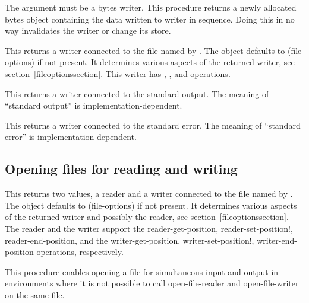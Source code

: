 \begin{entry}{%
}
   
The  argument must be a bytes writer.  This procedure
returns a newly allocated bytes object containing the data written to
writer in sequence. Doing this in no way invalidates the writer or
change its store.
\end{entry}

\begin{entry}{%
}
   
This returns a writer connected to the file named by .
The  object defaults to {\cf (file-options)} if not
present. It determines various aspects of the returned writer, see
section~\ref{fileoptionssection}.  This writer has ,
, and  operations.
\end{entry}

\begin{entry}{%
}
   
This returns a writer connected to the standard output. The meaning of
``standard output'' is implementation-dependent.
\end{entry}

\begin{entry}{%
}
   
This returns a writer connected to the standard error. The meaning of
``standard error'' is implementation-dependent.
\end{entry}   

\subsection{Opening files for reading and writing}

\begin{entry}{%
}
   
This returns two values, a reader and a writer connected to the file
named by . The  object defaults to
{\cf (file-options)} if not present. It determines various aspects of
the returned writer and possibly the reader, see
section~\ref{fileoptionssection}. The reader and the writer support
the {\cf reader-get-position}, {\cf reader-set-position!}, {\cf
  reader-end-position}, and the {\cf writer-get-position}, {\cf
  writer-set-position!}, {\cf writer-end-position} operations,
respectively.

\begin{note}
  This procedure enables opening a file for simultaneous input and
  output in environments where it is not possible to call
  open-file-reader and open-file-writer on the same file.
\end{note}     
\end{entry}

